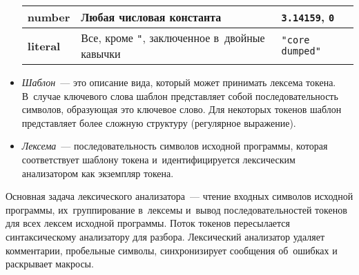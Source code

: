 \begin{itemize}
{\begin{table} [h!tbp]
\begin{tabular}{| p{3cm} | p{6cm} | p{5cm} |}
				\textbf{number}  	& 	Любая числовая константа													& 	\texttt{3.14159}, \texttt{0} 				\\ \hline
				\textbf{literal}  	& 	Все, кроме \texttt{"}, заключенное в~двойные кавычки 						& 	\texttt{"core dumped"} 						\\ \hline	
			\end{tabular}
		\end{table}	
	}
	\item{\textit{Шаблон}~--- это описание вида, который может принимать лексема токена. В~случае ключевого слова шаблон представляет собой последовательность символов, образующая это ключевое слово. Для некоторых токенов шаблон представляет более сложную структуру (регулярное выражение).}
	\item{\textit{Лексема}~--- последовательность символов исходной программы, которая соответствует шаблону токена и~идентифицируется лексическим анализатором как экземпляр токена.}
\end{itemize}

Основная задача лексического анализатора~--- чтение входных символов исходной программы, их~группирование в~лексемы и~вывод последовательностей токенов для всех лексем исходной программы. Поток токенов пересылается синтаксическому анализатору для разбора. Лексический анализатор удаляет комментарии, пробельные символы, синхронизирует сообщения об~ошибках и раскрывает макросы.